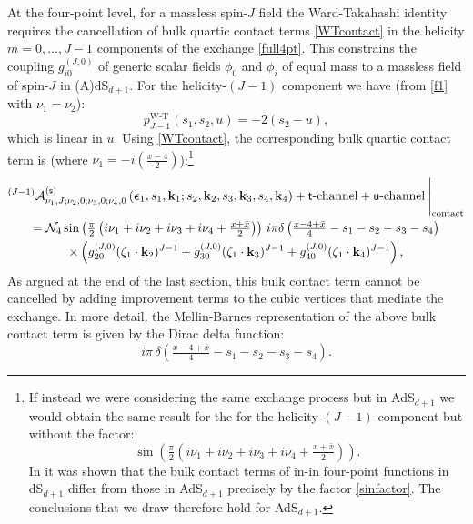 \documentclass[11pt,a4paper]{article}
\begin{document}
At the four-point level, for a massless spin-$J$ field the Ward-Takahashi identity requires the cancellation of bulk quartic contact terms \eqref{WTcontact} in the helicity $m=0, \ldots, J-1$ components of the exchange \eqref{full4pt}. This constrains the coupling $g^{\left(J,0\right)}_{i0}$ of generic scalar fields $\phi_0$ and $\phi_i$ of equal mass to a massless field of spin-$J$ in (A)dS$_{d+1}$. For the helicity-$\left(J-1\right)$ component we have (from \eqref{f1} with $\nu_1=\nu_2$):
\begin{equation}\label{impWT3pt}
    p^{\text{W-T}}_{J-1}\left(s_1,s_2,u\right) = -2\left(s_2-u\right),
\end{equation}
which is linear in $u$. Using \eqref{WTcontact}, the corresponding bulk quartic contact term is (where $\nu_1=- i \left(\frac{x-4}{2}\right)$):\footnote{If instead we were considering the same exchange process but in AdS$_{d+1}$ we would obtain the same result for the for the helicity-$\left(J-1\right)$-component but without the factor: 
\begin{equation}\label{sinfactor}
    \sin \left(\tfrac{\pi}{2} \left( i\nu_1+i\nu_2+i\nu_3+i\nu_4+\tfrac{x+{\bar x}}{2}\right)\right).
\end{equation}
In \cite{Sleight:2019mgd} it was shown that the bulk contact terms of in-in four-point functions in dS$_{d+1}$ differ from those in AdS$_{d+1}$ precisely by the factor \eqref{sinfactor}. The conclusions that we draw therefore hold for AdS$_{d+1}$.} 
\begin{multline}\label{mlcontact}
{}^{\left(J-1\right)}{\cal A}^{\left({\sf s}\right)}_{\nu_1,J;\nu_2,0;\nu_3,0;\nu_4,0}\left(\boldsymbol{\epsilon}_1,s_1,{\bf k}_1;s_2,{\bf k}_2,s_3,{\bf k}_3,s_4,{\bf k}_4\right)+ {\sf t}\text{-channel}+ {\sf u}\text{-channel}\:\Bigg|_{\text{contact}}\\
= {\cal N}_4 \sin \left(\tfrac{\pi}{2} \left( i\nu_1+i\nu_2+i\nu_3+i\nu_4+\tfrac{x+{\bar x}}{2}\right)\right)\,i \pi \delta\left(\tfrac{x-4+{\bar x}}{4}-s_1-s_2-s_3-s_4\right) \\ \times \left(g_{20}^{(J,0)}(\zeta_1\cdot\bold{k}_2)^{J-1}+g_{30}^{(J,0)}(\zeta_1\cdot\bold{k}_3)^{J-1}+g_{40}^{(J,0)}(\zeta_1\cdot\bold{k}_4)^{J-1}\right),
\end{multline}
As argued at the end of the last section, this bulk contact term cannot be cancelled by adding improvement terms to the cubic vertices that mediate the exchange. In more detail, the Mellin-Barnes representation of the above bulk contact term is given by the Dirac delta function:
\begin{equation}\label{ddcontactml}
   i \pi\, \delta\left(\tfrac{x-4+{\bar x}}{4}-s_1-s_2-s_3-s_4\right).
\end{equation}
\end{document}
